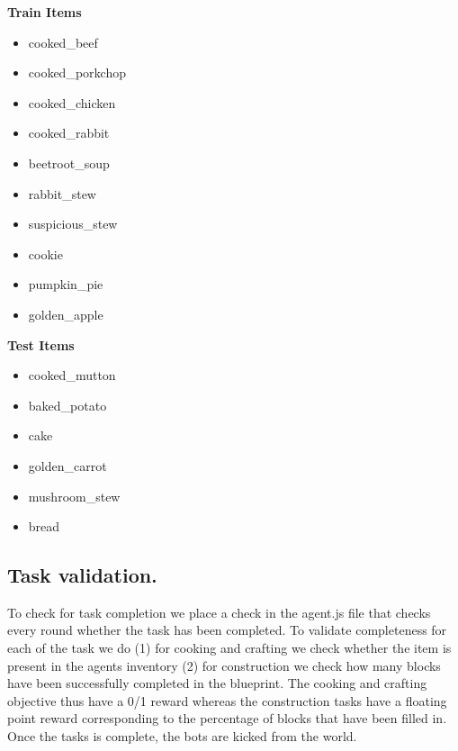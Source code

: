 \documentclass{article}
\begin{document}
\noindent
\begin{minipage}{0.45\textwidth}
    \textbf{Train Items}
    \begin{itemize}
        \item cooked\_beef
        \item cooked\_porkchop
        \item cooked\_chicken
        \item cooked\_rabbit
        \item beetroot\_soup
        \item rabbit\_stew
        \item suspicious\_stew
        \item cookie
        \item pumpkin\_pie
        \item golden\_apple
    \end{itemize}
\end{minipage}
\hfill
\begin{minipage}{0.45\textwidth}
    \textbf{Test Items}
    \begin{itemize}
        \item cooked\_mutton
        \item baked\_potato
        \item cake
        \item golden\_carrot
        \item mushroom\_stew
        \item bread
    \end{itemize}
\end{minipage}

\subsection{Task validation.}

To check for task completion we place a check in the agent.js file that checks every round whether the task has been completed. To validate completeness for each of the task we do (1) for cooking and crafting we check whether the item is present in the agents inventory (2) for construction we check how many blocks have been successfully completed in the blueprint. The cooking and crafting objective thus have a 0/1 reward whereas the construction tasks have a floating point reward corresponding to the percentage of blocks that have been filled in. Once the tasks is complete, the bots are kicked from the world. 
\end{document}
